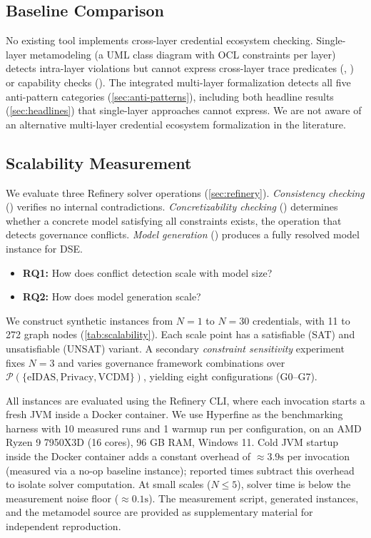\subsection{Baseline Comparison}\label{sec:baseline}

No existing tool implements cross-layer credential ecosystem checking. Single-layer metamodeling (a UML class diagram with OCL constraints per layer) detects intra-layer violations but cannot express cross-layer trace predicates (, ) or capability checks (). The integrated multi-layer formalization detects all five anti-pattern categories (\autoref{sec:anti-patterns}), including both headline results (\autoref{sec:headlines}) that single-layer approaches cannot express. We are not aware of an alternative multi-layer credential ecosystem formalization in the literature.

\subsection{Scalability Measurement}\label{sec:scalability}

We evaluate three Refinery solver operations (\autoref{sec:refinery}). \emph{Consistency checking} () verifies no internal contradictions. \emph{Concretizability checking} () determines whether a concrete model satisfying all constraints exists, the operation that detects governance conflicts. \emph{Model generation} () produces a fully resolved model instance for \ac{DSE}.

\begin{itemize}
\tightlist
\item
  \textbf{RQ1:} How does conflict detection scale with model size?
\item
  \textbf{RQ2:} How does model generation scale?
\end{itemize}

We construct synthetic instances from \(N{=}1\) to \(N{=}30\) credentials, with 11 to 272 graph nodes (\autoref{tab:scalability}). Each scale point has a satisfiable (SAT) and unsatisfiable (UNSAT) variant. A secondary \emph{constraint sensitivity} experiment fixes \(N{=}3\) and varies governance framework combinations over \(\mathcal{P}(\{\text{eIDAS}, \text{Privacy}, \text{VCDM}\})\), yielding eight configurations (G0--G7).

All instances are evaluated using the Refinery CLI, where each invocation starts a fresh JVM inside a Docker container. We use Hyperfine as the benchmarking harness with 10 measured runs and 1 warmup run per configuration, on an AMD Ryzen 9 7950X3D (16 cores), 96 GB RAM, Windows 11. Cold JVM startup inside the Docker container adds a constant overhead of \({\approx}3.9\text{s}\) per invocation (measured via a no-op baseline instance); reported times subtract this overhead to isolate solver computation. At small scales (\(N \leq 5\)), solver time is below the measurement noise floor (\({\approx}0.1\text{s}\)). The measurement script, generated instances, and the metamodel source are provided as supplementary material for independent reproduction.

